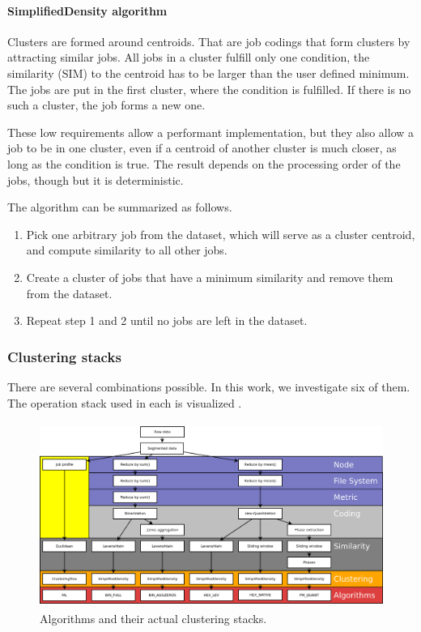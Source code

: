 \documentclass[]{llncs}
\makeatletter
\newcommand{\eb}[1]{\todo[inline]{EB:\@#1}}
\makeatother
\begin{document}

\paragraph{SimplifiedDensity algorithm}
Clusters are formed around centroids.
That are job codings that form clusters by attracting similar jobs.
All jobs in a cluster fulfill only one condition, the similarity (SIM) to the centroid has to be larger than the user defined minimum.
The jobs are put in the first cluster, where the condition is fulfilled.
If there is no such a cluster, the job forms a new one.

These low requirements allow a performant implementation, but they also allow a job to be in one cluster, even if a centroid of another cluster is much closer, as long as the condition is true.
The result depends on the processing order of the jobs, though but it is deterministic.

The algorithm can be summarized as follows.

\begin{enumerate}
 \item Pick one arbitrary job from the dataset, which will serve as a cluster centroid, and compute similarity to all other jobs.
 \item Create a cluster of jobs that have a minimum similarity and remove them from the dataset.
 \item Repeat step 1 and 2 until no jobs are left in the dataset.
\end{enumerate}

\subsubsection{Clustering stacks}
There are several combinations possible.
In this work, we investigate six of them.
The operation stack used in each is visualized .

\begin{figure}
  \centering
  \includegraphics[width=4.61in,height=2.38in]{./media/image3.png}
  \caption{Algorithms and their actual clustering stacks.}
  \label{fig:clustering_stacks}
\end{figure}
\end{document}
